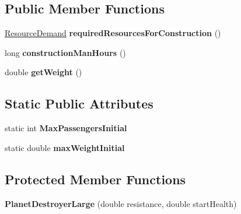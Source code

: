 \subsection*{Public Member Functions}
\begin{DoxyCompactItemize}
\item 
\hyperlink{classuniverse_1_1_resource_demand}{Resource\+Demand} {\bfseries required\+Resources\+For\+Construction} ()\hypertarget{classtools_1_1vehicles_1_1space_1_1_planet_destroyer_large_a20160c3c79406a9ddbb611ee123a2fd4}{}\label{classtools_1_1vehicles_1_1space_1_1_planet_destroyer_large_a20160c3c79406a9ddbb611ee123a2fd4}

\item 
long {\bfseries construction\+Man\+Hours} ()\hypertarget{classtools_1_1vehicles_1_1space_1_1_planet_destroyer_large_af812421373c70a3d1fae35f9c99c80c9}{}\label{classtools_1_1vehicles_1_1space_1_1_planet_destroyer_large_af812421373c70a3d1fae35f9c99c80c9}

\item 
double {\bfseries get\+Weight} ()\hypertarget{classtools_1_1vehicles_1_1space_1_1_planet_destroyer_large_ac264a9908876ebcff36c0ccb36ffc87a}{}\label{classtools_1_1vehicles_1_1space_1_1_planet_destroyer_large_ac264a9908876ebcff36c0ccb36ffc87a}

\end{DoxyCompactItemize}
\subsection*{Static Public Attributes}
\begin{DoxyCompactItemize}
\item 
static int {\bfseries Max\+Passengers\+Initial}\hypertarget{classtools_1_1vehicles_1_1space_1_1_planet_destroyer_large_ac6035156e58a4bde80cd4bc998c67513}{}\label{classtools_1_1vehicles_1_1space_1_1_planet_destroyer_large_ac6035156e58a4bde80cd4bc998c67513}

\item 
static double {\bfseries max\+Weight\+Initial}\hypertarget{classtools_1_1vehicles_1_1space_1_1_planet_destroyer_large_aae4117d2342ca7a44f3617b36fb61908}{}\label{classtools_1_1vehicles_1_1space_1_1_planet_destroyer_large_aae4117d2342ca7a44f3617b36fb61908}

\end{DoxyCompactItemize}
\subsection*{Protected Member Functions}
\begin{DoxyCompactItemize}
\item 
{\bfseries Planet\+Destroyer\+Large} (double resistance, double start\+Health)\hypertarget{classtools_1_1vehicles_1_1space_1_1_planet_destroyer_large_ac8b63014bb262a1f2fabaf5c48c8471e}{}\label{classtools_1_1vehicles_1_1space_1_1_planet_destroyer_large_ac8b63014bb262a1f2fabaf5c48c8471e}

\end{DoxyCompactItemize}
